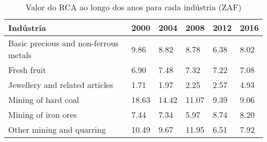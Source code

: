 \begin{table}
\centering
\caption{Valor do RCA ao longo dos anos para cada indústria (ZAF)}
\begin{tabular}{p{6cm}p{1.5cm}p{1.5cm}p{1.5cm}p{1.5cm}p{1.5cm}}
\toprule
                            Indústria &  2000 &  2004 &  2008 & 2012 & 2016 \\
\midrule
Basic precious and non-ferrous metals &  9.86 &  8.82 &  8.78 & 6.38 & 8.02 \\
                          Fresh fruit &  6.90 &  7.48 &  7.32 & 7.22 & 7.08 \\
       Jewellery and related articles &  1.71 &  1.97 &  2.25 & 2.57 & 4.93 \\
                  Mining of hard coal & 18.63 & 14.42 & 11.07 & 9.39 & 9.06 \\
                  Mining of iron ores &  7.44 &  7.34 &  5.97 & 8.74 & 8.20 \\
            Other mining and quarring & 10.49 &  9.67 & 11.95 & 6.51 & 7.92 \\
\bottomrule
\end{tabular}
\end{table}
